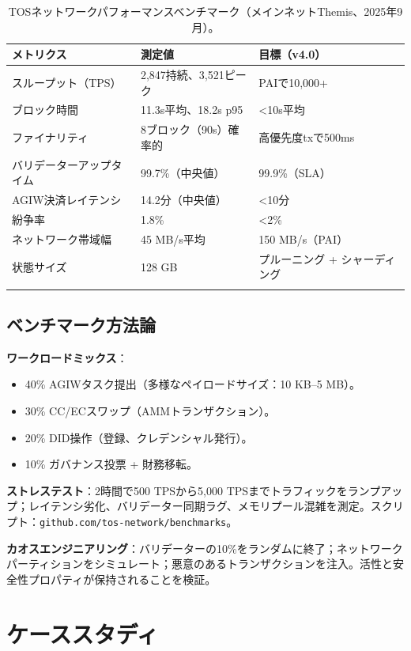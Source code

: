 \documentclass[11pt]{article}
\begin{document}
\begin{longtable}{@{}p{}p{}p{}@{}}
\toprule
\textbf{メトリクス} & \textbf{測定値} & \textbf{目標（v4.0）} \\\midrule
スループット（TPS） & 2,847持続、3,521ピーク & PAIで10,000+ \\
ブロック時間 & 11.3s平均、18.2s p95 & <10s平均 \\
ファイナリティ & 8ブロック（90s）確率的 & 高優先度txで500ms \\
バリデーターアップタイム & 99.7\%（中央値） & 99.9\%（SLA） \\
AGIW決済レイテンシ & 14.2分（中央値） & <10分 \\
紛争率 & 1.8\% & <2\% \\
ネットワーク帯域幅 & 45 MB/s平均 & 150 MB/s（PAI） \\
状態サイズ & 128 GB & プルーニング + シャーディング \\
\bottomrule
\caption{TOSネットワークパフォーマンスベンチマーク（メインネットThemis、2025年9月）。}
\end{longtable}

\subsection{ベンチマーク方法論}

\textbf{ワークロードミックス}：
\begin{itemize}[noitemsep]
  \item 40\% AGIWタスク提出（多様なペイロードサイズ：10 KB--5 MB）。
  \item 30\% CC/ECスワップ（AMMトランザクション）。
  \item 20\% DID操作（登録、クレデンシャル発行）。
  \item 10\% ガバナンス投票 + 財務移転。
\end{itemize}

\textbf{ストレステスト}：2時間で500 TPSから5,000 TPSまでトラフィックをランプアップ；レイテンシ劣化、バリデーター同期ラグ、メモリプール混雑を測定。スクリプト：\texttt{github.com/tos-network/benchmarks}。

\textbf{カオスエンジニアリング}：バリデーターの10\%をランダムに終了；ネットワークパーティションをシミュレート；悪意のあるトランザクションを注入。活性と安全性プロパティが保持されることを検証。

\section{ケーススタディ}
\label{sec:case-studies}
\end{document}
